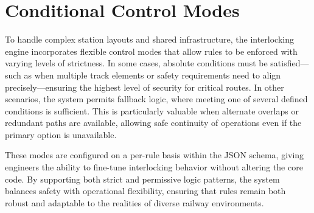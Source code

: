 \section{Conditional Control Modes}
\label{sec:interlocking:control-modes}

To handle complex station layouts and shared infrastructure, the interlocking engine incorporates flexible control modes that allow rules to be enforced with varying levels of strictness. In some cases, absolute conditions must be satisfied—such as when multiple track elements or safety requirements need to align precisely—ensuring the highest level of security for critical routes. In other scenarios, the system permits fallback logic, where meeting one of several defined conditions is sufficient. This is particularly valuable when alternate overlaps or redundant paths are available, allowing safe continuity of operations even if the primary option is unavailable.

These modes are configured on a per-rule basis within the JSON schema, giving engineers the ability to fine-tune interlocking behavior without altering the core code. By supporting both strict and permissive logic patterns, the system balances safety with operational flexibility, ensuring that rules remain both robust and adaptable to the realities of diverse railway environments.